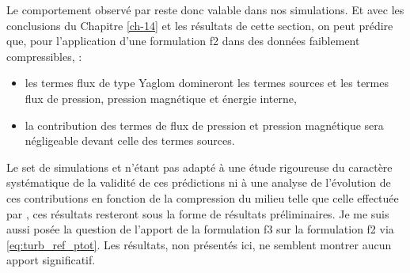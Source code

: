  Le comportement observé par  reste donc valable dans nos simulations. Et avec les conclusions du Chapitre \ref{ch-14} et les résultats de cette section, on peut prédire que, pour l'application d'une formulation f2 dans des données faiblement compressibles, : 
 \begin{itemize}
     \item les termes flux de type Yaglom domineront les termes sources et les termes flux de pression, pression magnétique et énergie interne,
     \item la contribution des termes de flux de pression et pression magnétique sera négligeable devant celle des termes sources.
 \end{itemize}
 Le set de simulations  et  n'étant pas adapté à une étude rigoureuse du caractère systématique de la validité de ces prédictions ni à une analyse de l'évolution de ces contributions en fonction de la compression du milieu telle que celle effectuée par , ces résultats resteront sous la forme de résultats préliminaires. Je me suis aussi posée la question de l'apport de la formulation f3 sur la formulation f2 via \eqref{eq:turb_ref_ptot}. Les résultats, non présentés ici, ne semblent montrer aucun apport significatif.
 

